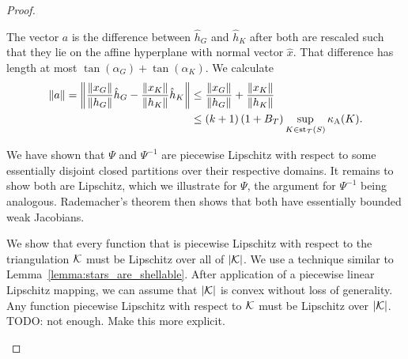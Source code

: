 \documentclass[10pt,a4paper]{article}
\newcommand{\mwl}[1]{{\color{red}#1}}
\begin{document}
\begin{proof}
\begin{itemize}
        
        
        The vector $a$ is the difference between $\hat h_{G}$ and $\hat h_{K}$ after both are rescaled such that they lie on the affine hyperplane with normal vector $\hat x$. That difference has length at most $\tan(\alpha_{G}) + \tan(\alpha_{K})$.
        We calculate 
        \begin{align*}
            \|a\|
            = 
            \left\|
            \frac{\|x_{G}\|}{\|h_{G}\|} \hat h_{{G}} 
            - 
            \frac{\|x_{K}\|}{\|h_{K}\|} \hat h_K
            \right\|
            &
            \leq 
            \frac{\|x_{G}\|}{\|h_{G}\|} 
            + 
            \frac{\|x_{K}\|}{\|h_{K}\|} 
            \\&
            \leq 
            (k+1) 
            \left( 1 + B_{T} \right)
            \sup_{ K \in \patch_{\calT}(S) }
            \aspectratio(K) %
            .
        \end{align*}
        
        We have shown that $\Psi$ and $\Psi^{-1}$ are piecewise Lipschitz with respect to some essentially disjoint closed partitions over their respective domains.
        It remains to show both are Lipschitz, which we illustrate for $\Psi$, the argument for $\Psi^{-1}$ being analogous. 
        Rademacher's theorem then shows that both have essentially bounded weak Jacobians. 
        
        We show that every function that is piecewise Lipschitz with respect to the triangulation ${\mathcal K}$ must be Lipschitz over all of $|{\mathcal K}|$. 
        We use a technique similar to Lemma~\ref{lemma:stars_are_shellable}. 
        After application of a piecewise linear Lipschitz mapping, 
        we can assume that $|{\mathcal K}|$ is convex without loss of generality. 
        Any function piecewise Lipschitz with respect to ${\mathcal K}$ must be Lipschitz over $|{\mathcal K}|$. 
        \mwl{TODO: not enough. Make this more explicit.}
        

\end{itemize}
\end{proof}
\end{document}
